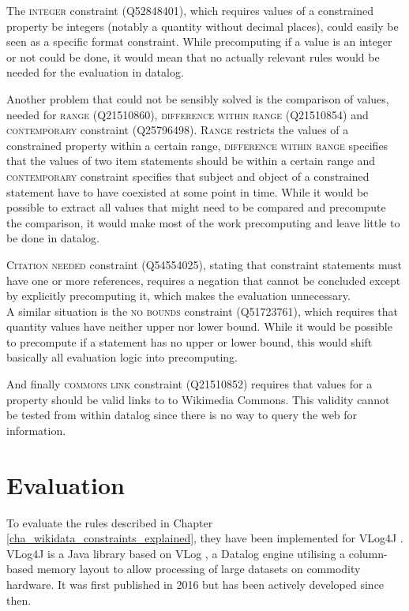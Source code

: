 \documentclass[hyperref,bachelorofscience,fleqn]{cgvpub}
\begin{document}
The \textsc{integer} constraint (Q52848401), which requires values of a constrained property be integers (notably a quantity without decimal places), could easily be seen as a specific format constraint. While precomputing if a value is an integer or not could be done, it would mean that no actually relevant rules would be needed for the evaluation in datalog.

Another problem that could not be sensibly solved is the comparison of values, needed for \textsc{range} (Q21510860), \textsc{difference within range} (Q21510854) and \textsc{contemporary} constraint (Q25796498). \textsc{Range} restricts the values of a constrained property within a certain range, \textsc{difference within range} specifies that the values of two item statements should be within a certain range and \textsc{contemporary} constraint specifies that subject and object of a constrained statement have to have coexisted at some point in time. While it would be possible to extract all values that might need to be compared and precompute the comparison, it would make most of the work precomputing and leave little to be done in datalog.

\textsc{Citation needed} constraint (Q54554025), stating that constraint statements must have one or more references, requires a negation that cannot be concluded except by explicitly precomputing it, which makes the evaluation unnecessary. \\
A similar situation is the \textsc{no bounds} constraint (Q51723761), which requires that quantity values have neither upper nor lower bound. While it would be possible to precompute if a statement has no upper or lower bound, this would shift basically all evaluation logic into precomputing.

And finally \textsc{commons link} constraint (Q21510852) requires that values for a property should be valid links to to Wikimedia Commons. This validity cannot be tested from within datalog since there is no way to query the web for information.

\chapter{Evaluation}\label{cha_evaluation}

To evaluate the rules described in Chapter \ref{cha_wikidata_constraints_explained}, they have been implemented for VLog4J \cite{vlog4j}. VLog4J is a Java library based on VLog \cite{vlog}, a Datalog engine utilising a column-based memory layout to allow processing of large datasets on commodity hardware. It was first published in 2016\cite{UJK2016} but has been actively developed since then.
\end{document}
